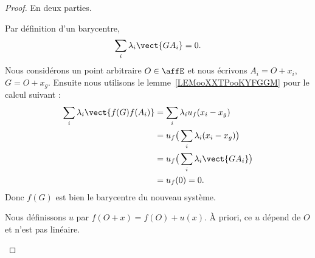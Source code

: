 \begin{proof}
	En deux parties.
	\begin{subproof}

		Par définition d'un barycentre,
		\begin{equation}
			\sum_i\lambda_i\vect{ GA_i }=0.
		\end{equation}
		Nous considérons un point arbitraire \( O\in\affE\) et nous écrivons \( A_i=O+x_i\), \( G=O+x_g\). Ensuite nous utilisons le lemme~\ref{LEMooXXTPooKYFGGM} pour le calcul suivant :
		\begin{subequations}
			\begin{align}
				\sum_i\lambda_i\vect{ f(G)f(A_i) } & =\sum_i\lambda_iu_f(x_i-x_g)                 \\
				                                   & =u_f\big( \sum_i\lambda_i(x_i-x_g) \big)     \\
				                                   & =u_f\big( \sum_i\lambda_i\vect{ GA_i } \big) \\
				                                   & =u_f(0)=0.
			\end{align}
		\end{subequations}
		Donc \( f(G)\) est bien le barycentre du nouveau système.


		Nous définissons \( u\) par \( f(O+x)=f(O)+u(x)\). À priori, ce \( u\) dépend de \( O\) et n'est pas linéaire.
		\begin{subproof}


\end{subproof}
\end{subproof}
\end{proof}
